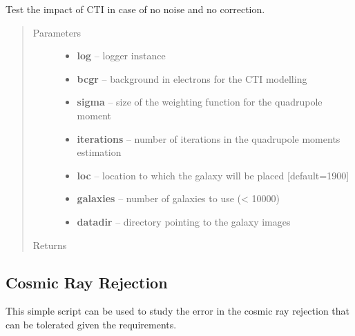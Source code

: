 \documentclass[a4paper,11pt,english]{sphinxmanual}
\begin{document}
\begin{fulllineitems}
\label{reduction:analysis.testCTIcorrection.useThibautsData}
Test the impact of CTI in case of no noise and no correction.
\begin{quote}\begin{description}
\item[{Parameters}] \leavevmode\begin{itemize}
\item {} 
\textbf{log} -- logger instance

\item {} 
\textbf{bcgr} -- background in electrons for the CTI modelling

\item {} 
\textbf{sigma} -- size of the weighting function for the quadrupole moment

\item {} 
\textbf{iterations} -- number of iterations in the quadrupole moments estimation

\item {} 
\textbf{loc} -- location to which the galaxy will be placed {[}default=1900{]}

\item {} 
\textbf{galaxies} -- number of galaxies to use (\textless{} 10000)

\item {} 
\textbf{datadir} -- directory pointing to the galaxy images

\end{itemize}

\item[{Returns}] \leavevmode


\end{description}\end{quote}

\end{fulllineitems}

\label{reduction:module-analysis.cosmicrayCalibration}

\subsection{Cosmic Ray Rejection}
\label{reduction:cosmic-ray-rejection}
This simple script can be used to study the error in the cosmic ray rejection that can be tolerated given the
requirements.
\end{document}
